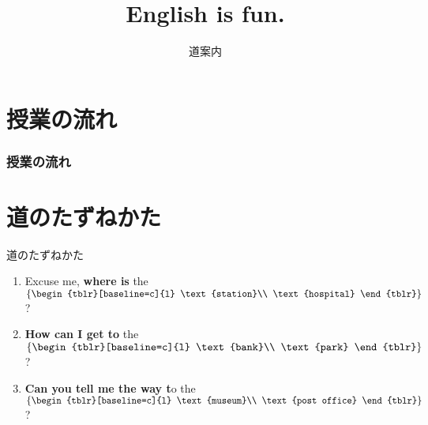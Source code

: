 \documentclass[aspectratio=169,xcolor={dvipsnames,table}]{beamer}
\title{English is fun.}
\subtitle{道案内}
\author{}
\institute[]{}
\date[]
\begin{document}
\begin{frame}[plain]
  \titlepage
\end{frame}

\section*{授業の流れ}
\begin{frame}[plain]
  \frametitle{授業の流れ}
  \tableofcontents
\end{frame}

\section{道のたずねかた}
\begin{frame}[plain]{道のたずねかた}
\begin{enumerate}
 \item Excuse me, \textbf{where is} the $\left\{\begin{tblr}[baseline=c]{l}
                                 \text{station}\\
                                 \text{hospital}
                                 \end{tblr}\right\}$ ?
 \item \textbf{How can I get to} the $\left\{\begin{tblr}[baseline=c]{l}
                                 \text{bank}\\
                                 \text{park}
                                 \end{tblr}\right\}$ ?
 \item \textbf{Can you tell me the way t}o the $\left\{\begin{tblr}[baseline=c]{l}
                                 \text{museum}\\
                                 \text{post office}
                                 \end{tblr}\right\}$ ?
\end{enumerate}

\hfill{\scriptsize {}}
\end{frame}
\end{document}
